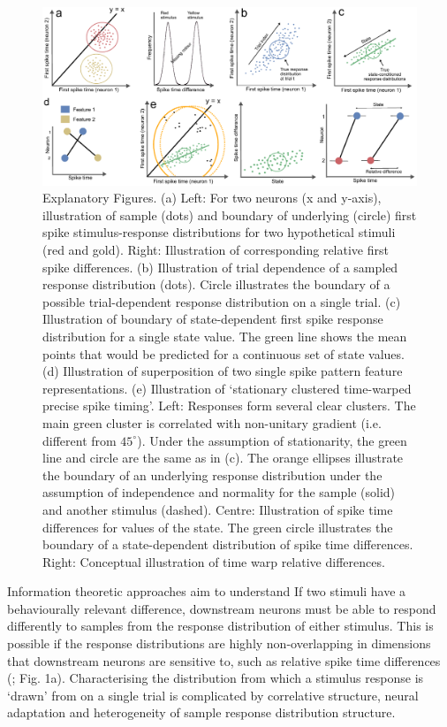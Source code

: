 \documentclass{article}
\begin{document}
\begin{figure}[t!]
\centering
\includegraphics[width=\textwidth]{Figure1.pdf}
\caption{Explanatory Figures. 
(a) Left: For two neurons (x and y-axis), illustration of sample (dots) and boundary of underlying (circle) first spike stimulus-response distributions for two hypothetical stimuli (red and gold). Right: Illustration of corresponding relative first spike differences. 
(b) Illustration of trial dependence of a sampled response distribution (dots). Circle illustrates the boundary of a possible trial-dependent response distribution on a single trial. 
(c) Illustration of boundary of state-dependent first spike response distribution for a single state value. The green line shows the mean points that would be predicted for a continuous set of state values.
(d) Illustration of superposition of two single spike pattern feature representations.
(e) Illustration of `stationary clustered time-warped precise spike timing'. Left: Responses form several clear clusters. The main green cluster is correlated with non-unitary gradient (i.e. different from $45^{\circ}$). Under the assumption of stationarity, the green line and circle are the same as in (c). The orange ellipses illustrate the boundary of an underlying response distribution under the assumption of independence and normality for the sample (solid) and another stimulus (dashed). Centre: Illustration of spike time differences for values of the state. The green circle illustrates the boundary of a state-dependent distribution of spike time differences. Right: Conceptual illustration of time warp relative differences.}
\label{fig:fig1}
\end{figure}

Information theoretic approaches aim to understand 
If two stimuli have a behaviourally relevant difference, downstream neurons must be able to respond differently to samples from the response distribution of either stimulus. This is possible if the response distributions are highly non-overlapping in dimensions that downstream neurons are sensitive to, such as relative spike time differences (\cite{gasparini2006state, branco2010dendritic, branco2011synaptic}; Fig. 1a). Characterising the distribution from which a stimulus response is `drawn' from on a single trial is complicated by correlative structure, neural adaptation and heterogeneity of sample response distribution structure.
\end{document}
